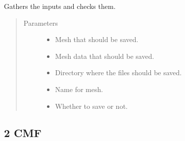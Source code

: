 \documentclass[letterpaper,10pt,english]{sphinxmanual}
\begin{document}
\begin{fulllineitems}
\begin{fulllineitems}
\end{fulllineitems}


\begin{fulllineitems}
\label{\detokenize{geometry:livestock.components.geometry.SaveMesh.run_checks}}
Gathers the inputs and checks them.
\begin{quote}\begin{description}
\item[{Parameters}] \leavevmode\begin{itemize}
\item {} 
 \textendash{} Mesh that should be saved.

\item {} 
 \textendash{} Mesh data that should be saved.

\item {} 
 \textendash{} Directory where the files should be saved.

\item {} 
 \textendash{} Name for mesh.

\item {} 
 \textendash{} Whether to save or not.

\end{itemize}

\end{description}\end{quote}

\end{fulllineitems}


\end{fulllineitems}







\subsection{2 \textbar{} CMF}
\label{\detokenize{cmf:cmf}}\label{\detokenize{cmf::doc}}\label{\detokenize{cmf:id3}}\label{\detokenize{cmf:module-livestock.components.comp_cmf}}
\end{document}
